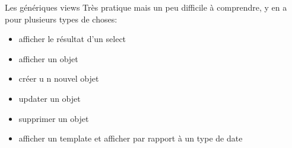 \documentclass{beamer}
\begin{document}
\begin{frame}[fragile]{Les génériques views}
    Très pratique mais un peu difficile à comprendre, y en a pour plusieurs types de choses:
    \begin{itemize}
        \item afficher le résultat d'un select
        \item afficher un objet
        \item créer u n nouvel objet
        \item updater un objet
        \item supprimer un objet
        \item afficher un template et afficher par rapport à un type de date
    \end{itemize}
\end{frame}
\end{document}
